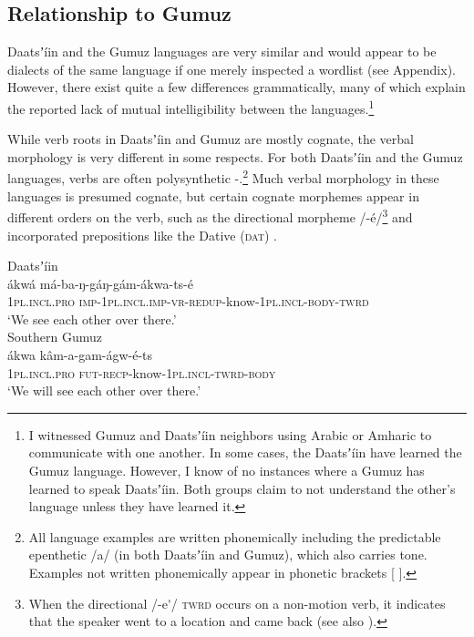 \documentclass[output=paper]{langsci/langscibook}
\begin{document}
\subsection{Relationship to Gumuz}\label{sec:ahlandc:2.2}

Daatsʼíin and the Gumuz languages are very similar and would appear to be dialects of the same language if one merely inspected a wordlist (see Appendix). However, there exist quite a few differences grammatically, many of which explain the reported lack of mutual intelligibility between the languages.\footnote{I witnessed Gumuz and Daatsʼíin neighbors using Arabic or Amharic to communicate with one another. In some cases, the Daatsʼíin have learned the Gumuz language. However, I know of no instances where a Gumuz has learned to speak Daatsʼíin. Both groups claim to not understand the other’s language unless they have learned it.}

While verb roots in Daatsʼíin and Gumuz are mostly cognate, the verbal morphology is very different in some respects. For both Daatsʼíin and the Gumuz languages, verbs are often polysynthetic -.\footnote{All language examples are written phonemically including the predictable epenthetic /a/ (in both Daatsʼíin and Gumuz), which also carries tone. Examples not written phonemically appear in phonetic brackets [ ].} Much verbal morphology in these languages is presumed cognate, but certain cognate morphemes appear in different orders on the verb, such as the directional morpheme /-é/\footnote{When the directional /-e\'{ }/ \textsc{twrd} occurs on a non-motion verb, it indicates that the speaker went to a location and came back (see also \citealt{Ahland2012Gumuz}).}  and incorporated prepositions like the Dative (\textsc{dat}) .

\ea\label{ex:ahlandc:1}
\ea\label{ex:ahlandc:1a}  
Daatsʼíin  \\
\gll
ákwá    má-ba-ŋ-gáŋ-gám-ákwa-ts-é\\
\textsc{1pl.incl.pro}   \textsc{imp-1pl.incl.imp-vr-redup}-know-\textsc{1pl.incl-body-twrd}\\
\glt ‘We see each other over there.’ \\

\ex\label{ex:ahlandc:1b}  
Southern Gumuz \\
\gll
 ákwa    kâm-a-gam-ágw-é-ts \\
  \textsc{1pl.incl.pro}   \textsc{fut-recp-}know-\textsc{1pl.incl-twrd-body}\\ 
\glt ‘We will see each other over there.’
\z
\z
\end{document}
